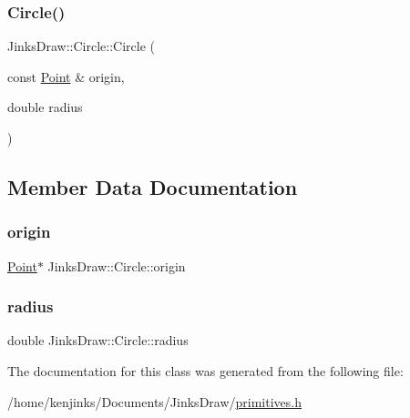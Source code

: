 \subsubsection{\texorpdfstring{Circle()}{Circle()}}
{\footnotesize\ttfamily Jinks\+Draw\+::\+Circle\+::\+Circle (\begin{DoxyParamCaption}\item[{const \mbox{\hyperlink{class_jinks_draw_1_1_point}{Point}} \&}]{origin,  }\item[{double}]{radius }\end{DoxyParamCaption})}



\subsection{Member Data Documentation}
\mbox{\label{class_jinks_draw_1_1_circle_a2214560f54448ce8c0bbb41dc956abe4}} 
\subsubsection{\texorpdfstring{origin}{origin}}
{\footnotesize\ttfamily \mbox{\hyperlink{class_jinks_draw_1_1_point}{Point}}$\ast$ Jinks\+Draw\+::\+Circle\+::origin\hspace{0.3cm}{\ttfamily [private]}}

\mbox{\label{class_jinks_draw_1_1_circle_ad38af0c31ab4aa5d90aaf6cf83a60ab2}} 
\subsubsection{\texorpdfstring{radius}{radius}}
{\footnotesize\ttfamily double Jinks\+Draw\+::\+Circle\+::radius\hspace{0.3cm}{\ttfamily [private]}}



The documentation for this class was generated from the following file\+:\begin{DoxyCompactItemize}
\item 
/home/kenjinks/\+Documents/\+Jinks\+Draw/\mbox{\hyperlink{primitives_8h}{primitives.\+h}}\end{DoxyCompactItemize}
